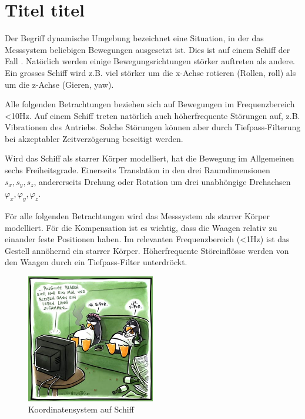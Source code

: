\section{Titel titel}

Der Begriff dynamische Umgebung bezeichnet eine Situation, 
in der das Messsystem beliebigen Bewegungen ausgesetzt ist. Dies ist auf einem Schiff der Fall \cite{comprehensiveMass}. Natörlich werden einige Bewegungsrichtungen störker auftreten als andere. Ein grosses Schiff wird z.B. viel störker um die x-Achse rotieren (Rollen, roll) als um die z-Achse (Gieren, yaw).

Alle 
folgenden Betrachtungen beziehen sich auf Bewegungen im Frequenzbereich <10Hz. Auf einem Schiff treten natörlich auch höherfrequente Störungen auf, z.B. Vibrationen des Antriebs. Solche Störungen können aber durch Tiefpass-Filterung bei akzeptabler Zeitverzögerung beseitigt werden.

Wird das Schiff als starrer Körper modelliert, 
hat die Bewegung im Allgemeinen sechs Freiheitsgrade. Einerseits Translation in den drei Raumdimensionen $s_x, s_y, s_z$, andererseits Drehung oder Rotation um drei unabhöngige Drehachsen $\varphi_x, \varphi_y, \varphi_z$.

För alle folgenden Betrachtungen wird das Messsystem als starrer 
Körper modelliert. För die Kompensation ist es wichtig, dass die Waagen relativ zu einander feste Positionen haben. Im relevanten Frequenzbereich (<1Hz) ist das Gestell annöhernd ein starrer Körper. Höherfrequente Störeinflösse werden von den Waagen durch ein Tiefpass-Filter unterdröckt. 
\begin{figure}[htb]
	\centering	   \includegraphics[width=0.5\textwidth]{./pictures/bild}
	\caption{Koordinatensystem auf Schiff}
	\label{fig:koordinatensys_freiheitsgrade}
\end{figure}

